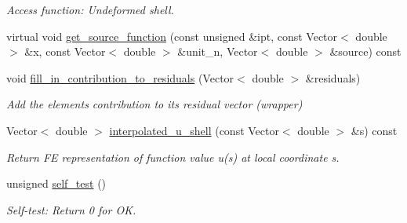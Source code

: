 \begin{DoxyCompactItemize}
\begin{DoxyCompactList}\small\item\em Access function\+: Undeformed shell. \end{DoxyCompactList}\item 
virtual void \hyperlink{classoomph_1_1MyShellEquations_a6c1858131a4ddd0c59a45449db7e182a}{get\+\_\+source\+\_\+function} (const unsigned \&ipt, const Vector$<$ double $>$ \&x, const Vector$<$ double $>$ \&unit\+\_\+n, Vector$<$ double $>$ \&source) const
\item 
void \hyperlink{classoomph_1_1MyShellEquations_ac612ccae94aed8f8ce5b9cc9410f5424}{fill\+\_\+in\+\_\+contribution\+\_\+to\+\_\+residuals} (Vector$<$ double $>$ \&residuals)
\begin{DoxyCompactList}\small\item\em Add the element\textquotesingle{}s contribution to its residual vector (wrapper) \end{DoxyCompactList}\item 
Vector$<$ double $>$ \hyperlink{classoomph_1_1MyShellEquations_a6f170026c39f99db20110a6d6e76e6c0}{interpolated\+\_\+u\+\_\+shell} (const Vector$<$ double $>$ \&s) const
\begin{DoxyCompactList}\small\item\em Return FE representation of function value u(s) at local coordinate s. \end{DoxyCompactList}\item 
unsigned \hyperlink{classoomph_1_1MyShellEquations_ab78a1d617fdd782b3e60ffd89e0c4737}{self\+\_\+test} ()
\begin{DoxyCompactList}\small\item\em Self-\/test\+: Return 0 for OK. \end{DoxyCompactList}\end{DoxyCompactItemize}
